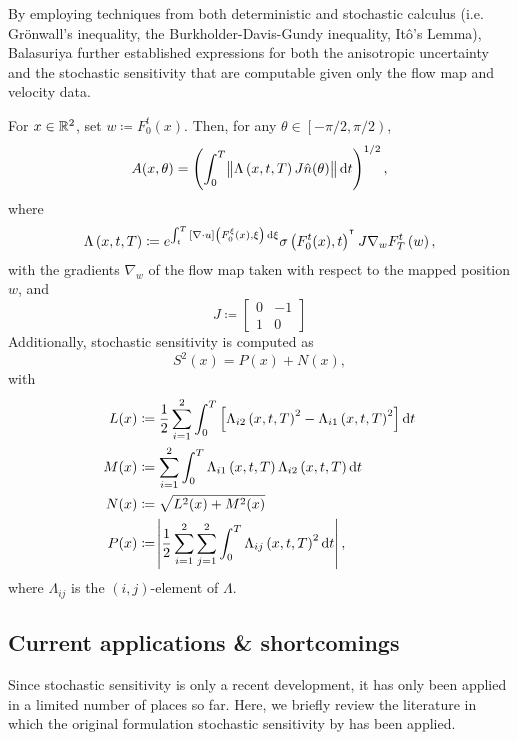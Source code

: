 By employing techniques from both deterministic and stochastic calculus (i.e. Gr\"onwall's inequality, the Burkholder-Davis-Gundy inequality, It\^o's Lemma), Balasuriya further established expressions for both the anisotropic uncertainty and the stochastic sensitivity that are computable given only the flow map and velocity data.

\begin{theorem}
	For \(x \in \mathbb{R}^2\), set \(w \coloneqq F_0^t(x)\).
	Then, for any \(\theta \in \left[-\pi/2, \pi/2\right)\),
	\[
		A(x,\theta) = \left(\int_0^T{\norm{\Lambda\left(x, t, T\right)J\hat{n}(\theta)}\dif t}\right)^{1/2},
	\]
	where
	\[
		\Lambda\left(x,t,T\right) \coloneqq e^{\int_t^T{\left[\nabla \cdot u\right]\left(F_0^\xi(x), \xi\right)\dif\xi}}\sigma\left(F_0^t(x), t\right)^{\T}J \nabla_w F_T^t\left(w\right),
	\]
	with the gradients \(\nabla_w\) of the flow map taken with respect to the mapped position \(w\), and 
	\[
		J \coloneqq \begin{bmatrix}
			0 & -1 \\ 
			1 & 0
		\end{bmatrix}
	\]
	Additionally, stochastic sensitivity is computed as 
	\[
		S^2(x) = P(x) + N(x),
	\]
	with 
	\begin{align*}
		L(x) & \coloneqq \frac12\sum_{i=1}^2\int_0^T\left[\Lambda_{i2}\left(x,t, T\right)^2 - \Lambda_{i1}\left(x,t,T\right)^2\right]\dif t \\ 
		M(x) & \coloneqq \sum_{i=1}^2\int_0^T{\Lambda_{i1}\left(x,t,T\right)\Lambda_{i2}\left(x,t,T\right)\dif t}\\ 
		N(x) & \coloneqq \sqrt{L^2(x) + M^2(x)} \\ 
		P(x) & \coloneqq \abs{\frac12\sum_{i=1}^2\sum_{j=1}^2{\int_0^T{\Lambda_{ij}\left(x,t,T\right)^2\dif t}}},
	\end{align*}
	where \(\Lambda_{ij}\) is the \((i,j)\)-element of \(\Lambda\).
\end{theorem}


\subsection{Current applications \& shortcomings}
Since stochastic sensitivity is only a recent development, it has only been applied in a limited number of places so far. 
Here, we briefly review the literature in which the original formulation stochastic sensitivity by \cite{Balasuriya_2020_StochasticSensitivityComputable} has been applied.

